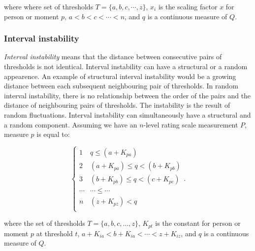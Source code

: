 \documentclass[utf8]{FrontiersinVancouver}
\begin{document}
where where set of thresholds $T = \{a, b, c, \cdots, z\}$, $x_{i}$ is the scaling factor $x$ for person or moment $p$, $a < b < c < \cdots < n$,  and $q$ is a continuous measure of $Q$.

\subsubsection{Interval instability}
\textit{Interval instability} means that the distance between consecutive pairs of thresholds is not identical. Interval instability can have a structural or a random appearence. An example of structural interval instability would be a growing distance between each subsequent neighbouring pair of thresholds. In random interval instability, there is no relationship between the order of the pairs and the distance of neighbouring pairs of thresholds. The instability is the result of random fluctuations. Interval instability can simultaneously have a structural and a random component. Assuming we have an $n$-level rating scale measurement $P$, measure $p$ is equal to:

\[
\begin{cases} 
    1 & q  \leq (a + K_{pa})\\
    2 & (a + K_{pa}) \leq q < (b + K_{pb})\\
    3 & (b + K_{pb})  \leq q < (c + K_{pc})\\
    \cdots & \cdots \leq \cdots\\    
    n & (z + K_{pz}) < q\\
\end{cases}.
\]

where the set of thresholds $T = \{a, b, c, \ldots, z\}$, $K_{pt}$ is the constant for person or moment $p$ at threshold $t$, $a + K_{ia} < b + K_{ia} < \cdots < z + K_{iz}$, and $q$ is a continuous measure of $Q$.
\end{document}
